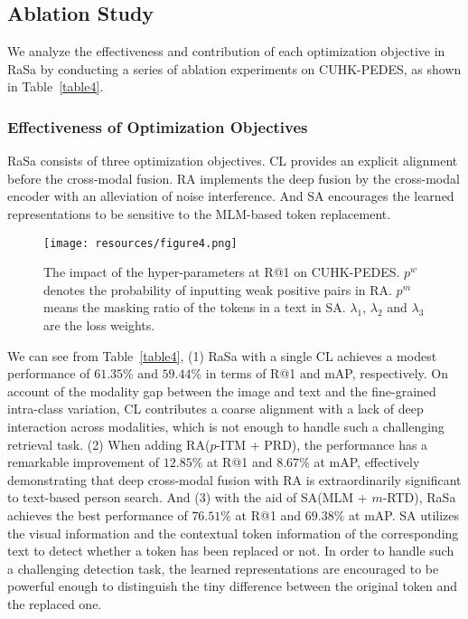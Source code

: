 \documentclass{article}
\begin{document}
\subsection{Ablation Study}


We analyze the effectiveness and contribution of each optimization objective in RaSa by conducting a series of ablation experiments on CUHK-PEDES, as shown in Table~\ref{table4}.


\subsubsection{Effectiveness of Optimization Objectives}
RaSa consists of three optimization objectives. CL provides an explicit alignment before the cross-modal fusion. RA implements the deep fusion by the cross-modal encoder with an alleviation of noise interference. And SA encourages the learned representations to be sensitive to the MLM-based token replacement.

\begin{figure*}[ht]
\setlength{\belowcaptionskip}{0.35cm}
\centering
\texttt{[image: resources/figure4.png]} \caption{The impact of the hyper-parameters at R@1 on CUHK-PEDES. $p^w$ denotes the probability of inputting weak positive pairs in RA. $p^m$ means the masking ratio of the tokens in a text in SA. $\lambda_1$, $\lambda_2$ and $\lambda_3$ are the loss weights.}
\label{fig4}
\end{figure*}

We can see from Table~\ref{table4},
(1) RaSa with a single CL achieves a modest performance of $61.35$\% and $59.44$\% in terms of R@1 and mAP, respectively. On account of the modality gap between the image and text and the fine-grained intra-class variation, CL contributes a coarse alignment with a lack of deep interaction across modalities, which is not enough to handle such a challenging retrieval task.
(2) When adding RA($p$-ITM + PRD), the performance has a remarkable improvement of $12.85$\% at R@1 and $8.67$\% at mAP, effectively demonstrating that deep cross-modal fusion with RA is extraordinarily significant to text-based person search.
And (3) with the aid of SA(MLM + $m$-RTD), RaSa achieves the best performance of $76.51$\% at R@1 and $69.38$\% at mAP. SA utilizes the visual information and the contextual token information of the corresponding text to detect whether a token has been replaced or not. In order to handle such a challenging detection task, the learned representations are encouraged to be powerful enough to distinguish the tiny difference between the original token and the replaced one.
\end{document}
